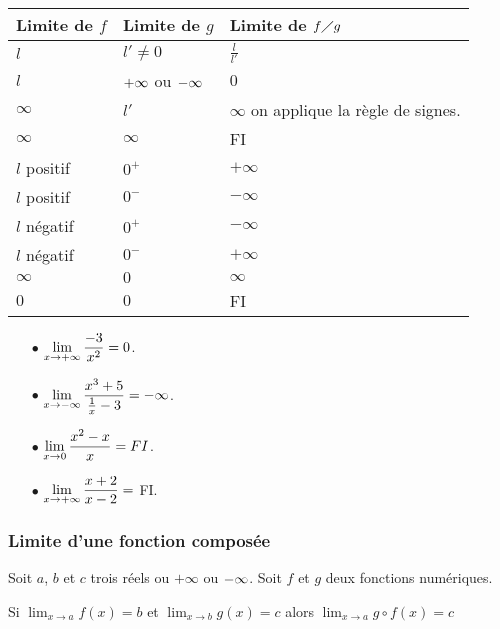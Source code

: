 \begin{tabularx}{\textwidth}{|X|X|X|}
\hline
Limite de $ f $ & Limite de $ g $ &Limite de $ f\diagup g $ \\
\hline
$ l $& $ l'\neq 0 $&$ \frac{l}{l'} $ \\
\hline
 $ l $& $ +\infty$  ou  $ -\infty $& $ 0 $\\
\hline
$ \infty $& $l' $& $ \infty $ \scriptsize{on applique la règle de signes.}\\
\hline

$ \infty $& $ \infty $& FI\\
\hline
$ l$ \scriptsize{positif}& $ 0^{+} $& $+ \infty $ \\
\hline
$ l$ \scriptsize{positif}& $ 0^{-} $& $ -\infty $ \\
\hline
$ l$ \scriptsize{négatif}& $ 0^{+} $& $- \infty $ \\
\hline
$ l$ \scriptsize{négatif}& $ 0^{-} $& $ +\infty $ \\
\hline
$ \infty $& $ 0 $& $ \infty $ \\
\hline

$ 0 $& $ 0 $& FI\\
\hline
\end{tabularx}
\begin{example}
\begin{itemize}
\item[$ \bullet $ ] $ \displaystyle \lim_{x\to +\infty}\frac{-3}{x^{2}}=0 $.
\item[$ \bullet $ ] $ \displaystyle \lim_{x\to -\infty}\frac{x^{3}+5}{\frac{1}{x}-3} =-\infty$.
\item[$ \bullet $ ]$ \displaystyle \lim_{x\to 0}\frac{x^{2}-x}{x} =FI$.
\item[$ \bullet $ ] $ \displaystyle \lim_{x\to +\infty}\frac{x+2}{x-2} =$  FI.
\end{itemize}
\end{example}


\subsubsection*{Limite d'une fonction composée}
\begin{property}
Soit $a $, $ b $ et  $ c$ trois réels  ou $ +\infty $  ou $ -\infty $.  Soit   $f$  et $g$ deux fonctions numériques.
 
Si \; $ \displaystyle\lim_{x \to a} f(x)=b $ \;  et  \;  $ \lim_{x \to b}g(x)=c  $ \; alors\;  $\displaystyle\lim_{x \to a} g\circ f(x)=c $
\end{property}


